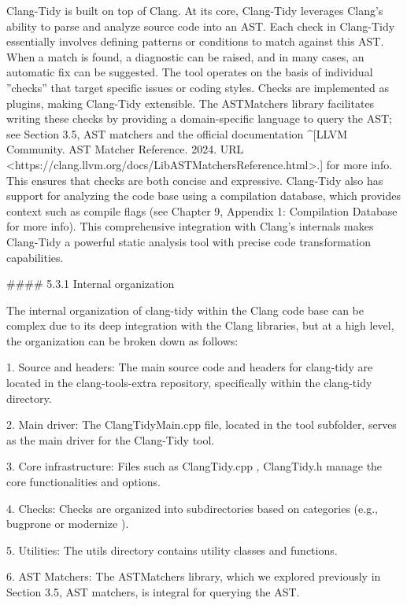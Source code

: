 

\begin{markdown}

Clang-Tidy is built on top of Clang. At its core, Clang-Tidy leverages Clang's ability to parse and analyze source code into an AST. Each check in Clang-Tidy essentially involves defining patterns or conditions to match against this AST. When a match is found, a diagnostic can be raised, and in many cases, an automatic fix can be suggested. The tool operates on the basis of individual ”checks” that target specific issues or coding styles. Checks are implemented as plugins, making Clang-Tidy extensible. The ASTMatchers library facilitates writing these checks by providing a domain-specific language to query the AST; see Section 3.5, AST matchers and the official documentation ^[LLVM Community. AST Matcher Reference. 2024. URL <https://clang.llvm.org/docs/LibASTMatchersReference.html>.] for more info. This ensures that checks are both concise and expressive. Clang-Tidy also has support for analyzing the code base using a compilation database, which provides context such as compile flags (see Chapter 9, Appendix 1: Compilation Database for more info). This comprehensive integration with Clang's internals makes Clang-Tidy a powerful static analysis tool with precise code transformation capabilities.

#### 5.3.1 Internal organization

The internal organization of clang-tidy within the Clang code base can be complex due to its deep integration with the Clang libraries, but at a high level, the organization can be broken down as follows:

1. Source and headers: The main source code and headers for clang-tidy are located in the clang-tools-extra repository, specifically within the clang-tidy directory.

2. Main driver: The ClangTidyMain.cpp file, located in the tool subfolder, serves as the main driver for the Clang-Tidy tool.

3. Core infrastructure: Files such as ClangTidy.cpp , ClangTidy.h manage the core functionalities and options.

4. Checks: Checks are organized into subdirectories based on categories (e.g., bugprone or modernize ).

5. Utilities: The utils directory contains utility classes and functions.

6. AST Matchers: The ASTMatchers library, which we explored previously in Section 3.5, AST matchers, is integral for querying the AST.


\end{markdown}
